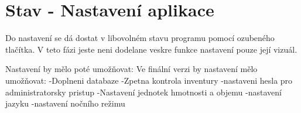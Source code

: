 




\section{Stav - Nastavení aplikace}
Do nastavení se dá dostat v libovolném stavu programu pomocí ozubeného tlačítka. V teto fázi jeste neni dodelane veskre funkce nastavení pouze její vizuál.

Nastavení by mělo poté umožňovat:
Ve finální verzi by nastavení mělo umožňovat:
-Doplneni databaze
-Zpetna kontrola inventury
-nastaveni hesla pro administratorsky pristup
-Nastavení jednotek hmotnosti a objemu
-nastavení jazyku
-nastavení nočního režimu



